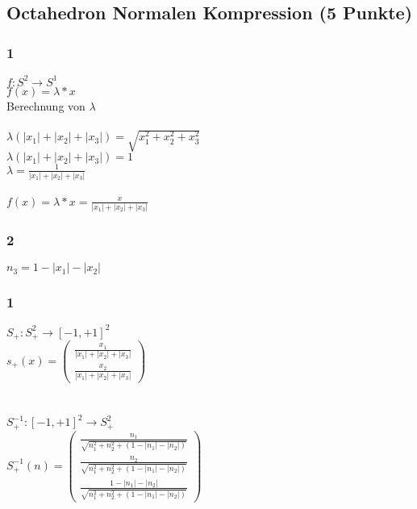 \newif\ifvimbug
\vimbugfalse

\ifvimbug

\fi


\subsection{Octahedron Normalen Kompression (5 Punkte)}
\subsubsection{1}
$f: S^{2} \rightarrow S^{1}$\\
$f(x) = \lambda * x$\\
Berechnung von $\lambda$\\
\\
$\lambda(|x_{1}| + |x_{2}| + |x_{3}|) = \sqrt{x_{1}^{2} + x_{2}^{2} + x_{3}^{2}}$\\
$\lambda(|x_{1}| + |x_{2}| + |x_{3}|) = 1$\\
$\lambda = \frac{1}{|x_{1}| + |x_{2}| + |x_{3}|}$\\
\\
$ f(x) = \lambda * x = \frac{x}{|x_{1}| + |x_{2}| + |x_{3}|}$
\subsubsection{2}
$n_{3} = 1 - |x_{1}| - |x_{2}|$
\subsubsection{1}
$S_{+}: S_{+}^{2} \rightarrow [-1, +1]^{2}$\\
$s_{+}(x) = \begin{pmatrix}
\frac{x_{1}}{|x_{1}| + |x_{2}| + |x_{3}|} \\ 
\frac{x_{2}}{|x_{1}| + |x_{2}| + |x_{3}|}
\end{pmatrix} $\\
\\
\\
$S_{+}^{-1}: [-1, +1]^{2} \rightarrow S_{+}^{2}$\\
$S_{+}^{-1}(n) = \begin{pmatrix}
\frac{n_{1}}{\sqrt{n_{1}^{2} + n_{2}^{2} + (1 - |n_{1}| - |n_{2}|)}} \\ 
\frac{n_{2}}{\sqrt{n_{1}^{2} + n_{2}^{2} + (1 - |n_{1}| - |n_{2}|)}} \\ 
\frac{1 - |n_{1}| - |n_{2}|}{\sqrt{n_{1}^{2} + n_{2}^{2} + (1 - |n_{1}| - |n_{2}|)}}
\end{pmatrix} $
